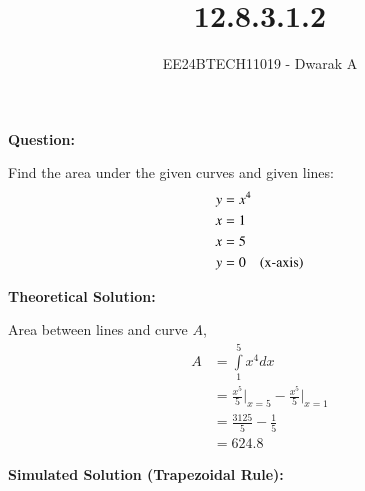 \documentclass[journal]{IEEEtran}
\begin{document}

\vspace{3cm}

\title{12.8.3.1.2}
\author{EE24BTECH11019 - Dwarak A}
{\let\newpage\relax\maketitle}

\renewcommand{\thefigure}{\theenumi}
\renewcommand{\thetable}{\theenumi}
\setlength{\intextsep}{10pt} %


\renewcommand{\thetable}{\theenumi}

\textbf{Question:}

Find the area under the given curves and given lines:
\begin{align}
    y &= x^4 \\
    x &= 1 \\
    x &= 5 \\
    y &= 0 \text{\quad(x-axis)}
\end{align}

\solution

\medskip

\textbf{Theoretical Solution:}

Area between lines and curve $A$,
\begin{align}
    A &= \int\limits_{1}^{5}x^4dx \\
    &= \frac{x^5}{5}\Big|_{x=5} - \frac{x^5}{5}\Big|_{x=1} \\
    &= \frac{3125}{5} - \frac{1}{5} \\
    &= 624.8
\end{align}

\medskip

\textbf{Simulated Solution (Trapezoidal Rule):}
\end{document}
